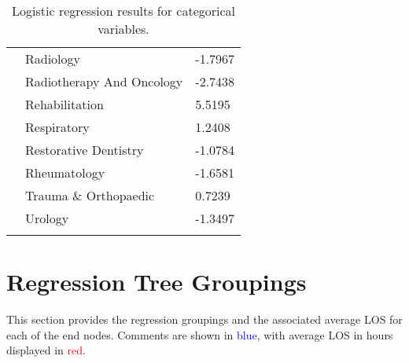 \documentclass[thesis.tex]{subfiles}
\begin{document}
{\begin{longtable}{lll}
&Radiology &  -1.7967  \\
&Radiotherapy And Oncology &  -2.7438  \\
&Rehabilitation &   5.5195  \\
&Respiratory &   1.2408  \\
&Restorative Dentistry &  -1.0784  \\
&Rheumatology &  -1.6581  \\
&Trauma \& Orthopaedic &   0.7239  \\
&Urology &  -1.3497  \\ \bottomrule
  \caption{Logistic regression results for categorical variables.}
    \label{tab:appLogregcat}
\end{longtable}}


\section{Regression Tree Groupings}\label{app:secregression}
This section provides the regression groupings and the associated average LOS for each of the end nodes. Comments are shown in \textcolor{blue}{blue}, with average LOS in hours displayed in \textcolor{red}{red}. 
\end{document}
